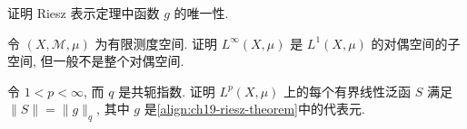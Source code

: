 \documentclass[../../main.tex]{subfiles}
\begin{document}
\begin{exercise}\label{exercise:ch19-06}
证明 Riesz 表示定理中函数 $g$ 的唯一性.
\end{exercise}

\begin{exercise}\label{exercise:ch19-07}
令 $(X,\mathcal{M},\mu)$ 为有限测度空间. 证明 $L^{\infty}(X,\mu)$ 是 $L^{1}(X,\mu)$ 的对偶空间的子空间, 但一般不是整个对偶空间.
\end{exercise}

\begin{exercise}\label{exercise:ch19-08}
令 $1<p<\infty$, 而 $q$ 是共轭指数. 证明 $L^{p}(X,\mu)$ 上的每个有界线性泛函 $S$ 满足 $\|S\|=\|g\|_{q}$, 其中 $g$ 是\eqref{align:ch19-riesz-theorem}中的代表元.
\end{exercise}
\end{document}
